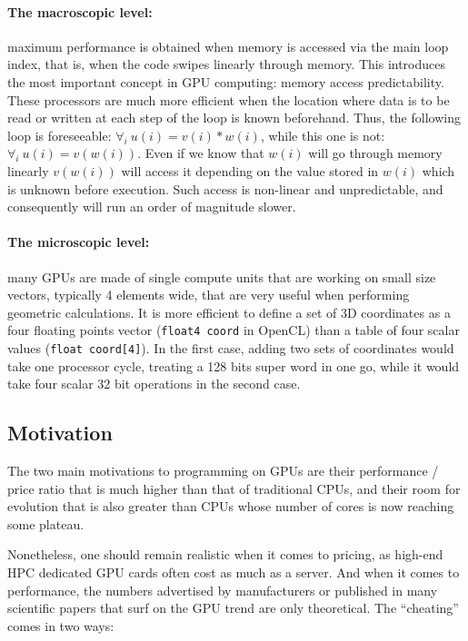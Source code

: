 \documentclass[a4paper,12pt]{article}
\begin{document}
\paragraph{The macroscopic level:} maximum performance is obtained when memory is accessed via the main loop index, that is, when the code swipes linearly through memory. This introduces the most important concept in GPU computing: memory access predictability. These processors are much more efficient when the location where data is to be read or written at each step of the loop is known beforehand. Thus, the following loop is foreseeable: $\forall_{i} ~u(i)=v(i)*w(i)$, while this one is not:$\forall_{i} ~u(i)=v(w(i))$. Even if we know that $w(i)$ will go through memory linearly $v(w(i))$ will access it depending on the value stored in $w(i)$ which is unknown before execution. Such access is non-linear and unpredictable, and consequently will run an order of magnitude slower.

\paragraph{The microscopic level:} many GPUs are made of single compute units that are working on small size vectors, typically 4 elements wide, that are very useful when performing geometric calculations. It is more efficient to define a set of 3D coordinates as a four floating points vector ({\tt float4 coord} in OpenCL) than a table of four scalar values ({\tt float coord[4]}). In the first case, adding two sets of coordinates would take one processor cycle, treating a 128 bits super word in one go, while it would take four scalar 32 bit operations in the second case.


\subsection{Motivation}
The two main motivations to programming on GPUs are their performance / price ratio that is much higher than that of traditional CPUs, and their room for evolution that is also greater than CPUs whose number of cores is now reaching some plateau.

Nonetheless, one should remain realistic when it comes to pricing, as high-end HPC dedicated GPU cards often cost as much as a server. And when it comes to performance, the numbers advertised by manufacturers or published in many scientific papers that surf on the GPU trend are only theoretical.
The ``cheating'' comes in two ways:
\end{document}
